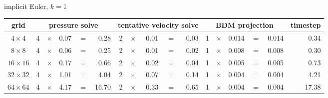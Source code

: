 \begin{center}
    implicit Euler, $k=1$\\[1ex]
    \begin{tabular}{|c|rcrcr|rcrcr|rcrcr|r|}
        \hline
        grid                                           &
        \multicolumn{5}{|c|}{pressure solve}           &
        \multicolumn{5}{|c|}{tentative velocity solve} &
        \multicolumn{5}{|c|}{BDM projection}           &
        timestep                                                                                                                                                           \\
        \hline\hline
        $ 4\times 4$                                   & 4 & $\times$ & 0.07 & $=$ & 0.28  & 2 & $\times$ & 0.01 & $=$ & 0.03 & 1 & $\times$ & 0.014 & $=$ & 0.014 & 0.34  \\
        $ 8\times 8$                                   & 4 & $\times$ & 0.06 & $=$ & 0.25  & 2 & $\times$ & 0.01 & $=$ & 0.02 & 1 & $\times$ & 0.008 & $=$ & 0.008 & 0.30  \\
        $16\times16$                                   & 4 & $\times$ & 0.17 & $=$ & 0.66  & 2 & $\times$ & 0.02 & $=$ & 0.04 & 1 & $\times$ & 0.005 & $=$ & 0.005 & 0.73  \\
        $32\times32$                                   & 4 & $\times$ & 1.01 & $=$ & 4.04  & 2 & $\times$ & 0.07 & $=$ & 0.14 & 1 & $\times$ & 0.004 & $=$ & 0.004 & 4.21  \\
        $64\times64$                                   & 4 & $\times$ & 4.17 & $=$ & 16.70 & 2 & $\times$ & 0.33 & $=$ & 0.65 & 1 & $\times$ & 0.004 & $=$ & 0.004 & 17.38 \\
        \hline\end{tabular}
\end{center}

